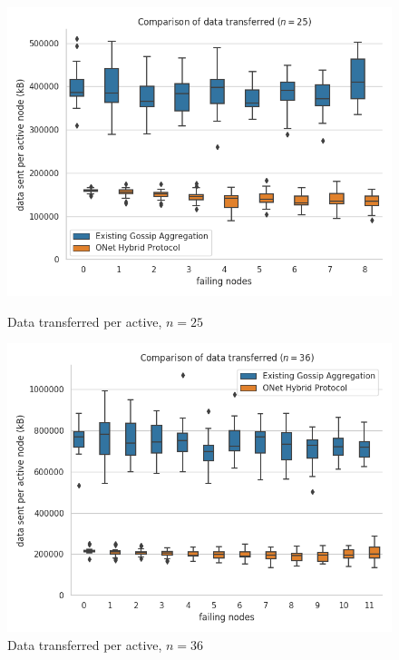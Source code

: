 \begin{figure}[H]
    \centering
    \begin{minipage}{0.5\textwidth}
        \centering
        \includegraphics[width=\textwidth]{images/bandwidth_tx_sum_25.png}
        \captionsetup{labelformat=empty}
        \caption{Data transferred per active, $n = 25$}
    \end{minipage}\hfill
    \begin{minipage}{0.5\textwidth}
        \centering
        \includegraphics[width=\textwidth]{images/bandwidth_tx_sum_36.png}
        \captionsetup{labelformat=empty}
        \caption{Data transferred per active, $n = 36$}
    \end{minipage}\hfill
\end{figure}